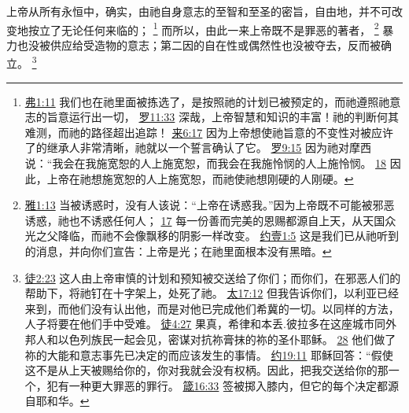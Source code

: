 \documentclass[12pt, a4paper, oneside]{ctexart}
\newcounter{parnum}[section]
\newcommand{\N}{%
   \noindent\refstepcounter{parnum}%
    \makebox[\parindent][l]{\textbf{\arabic{parnum}.}}}
\begin{document}
\N 上帝从所有永恒中，确实，由祂自身意志的至智和至圣的密旨，自由地，并不可改变地按立了无论任何来临的；
	\footnote {
		\href{https://biblehub.com/ephesians/1-11.htm}{弗1:11} 我们也在祂里面被拣选了，是按照祂的计划已被预定的，而祂遵照祂意志的旨意运行出一切，
		\href{https://biblehub.com/romans/11-33.htm}{罗11:33} 深哉，上帝智慧和知识的丰富！祂的判断何其难测，而祂的路径超出追踪！
		\href{https://biblehub.com/hebrews/6-17.htm}{来6:17} 因为上帝想使祂旨意的不变性对被应许了的继承人非常清晰，祂就以一个誓言确认了它。
		\href{https://biblehub.com/romans/9-15.htm}{罗9:15} 因为祂对摩西说：“我会在我施宽恕的人上施宽恕，而我会在我施怜悯的人上施怜悯。
		\href{https://biblehub.com/romans/9-18.htm}{18} 因此，上帝在祂想施宽恕的人上施宽恕，而祂使祂想刚硬的人刚硬。
	}
	而所以，由此一来上帝既不是罪恶的著者，
	\footnote {
		\href{https://biblehub.com/james/1-13.htm}{雅1:13} 当被诱惑时，没有人该说：“上帝在诱惑我。”因为上帝既不可能被邪恶诱惑，祂也不诱惑任何人；
		\href{https://biblehub.com/james/1-17.htm}{17} 每一份善而完美的恩赐都源自上天，从天国众光之父降临，而祂不会像飘移的阴影一样改变。
		\href{https://biblehub.com/1_john/1-5.htm}{约壹1:5} 这是我们已从祂听到的消息，并向你们宣告：上帝是光；在祂里面根本没有黑暗。
	}
	暴力也没被供应给受造物的意志；第二因的自在性或偶然性也没被夺去，反而被确立。
	\footnote {
		\href{https://biblehub.com/acts/2-23.htm}{徒2:23} 这人由上帝审慎的计划和预知被交送给了你们；而你们，在邪恶人们的帮助下，将祂钉在十字架上，处死了祂。
		\href{https://biblehub.com/matthew/17-12.htm}{太17:12} 但我告诉你们，以利亚已经来到，而他们没有认出他，而是对他已完成他们希冀的一切。以同样的方法，人子将要在他们手中受难。
		\href{https://biblehub.com/acts/4-27.htm}{徒4:27} 果真，希律和本丢.彼拉多在这座城市同外邦人和以色列族民一起会见，密谋对抗祢膏抹的祢的圣仆耶稣。
		\href{https://biblehub.com/acts/4-28.htm}{28} 他们做了祢的大能和意志事先已决定的而应该发生的事情。
		\href{https://biblehub.com/john/19-11.htm}{约19:11} 耶稣回答：“假使这不是从上天被赐给你的，你对我就会没有权柄。因此，把我交送给你的那一个，犯有一种更大罪恶的罪行。
		\href{https://biblehub.com/proverbs/16-33.htm}{箴16:33} 签被掷入膝内，但它的每个决定都源自耶和华。
	}
\end{document}
